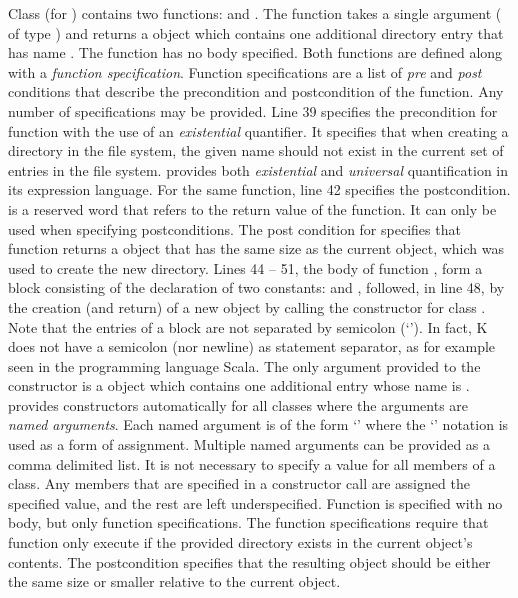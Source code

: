 Class  (for ) contains two functions:
 and . The  function takes a
single argument ( of type ) and returns a
 object which contains one additional directory entry that
has name . The  function has no body
specified. Both functions are defined along with a {\em function
  specification}. Function specifications are a list of {\em pre} and
{\em post} conditions that describe the precondition and postcondition
of the function. Any number of specifications may be provided. Line 39
specifies the precondition for function  with the use of
an {\em existential} quantifier. It specifies that when creating a
directory in the file system, the given name  should not exist
in the current set of entries in the file system. \Klang{} provides
both {\em existential} and {\em universal} quantification in its
expression language. For the same function, line 42 specifies the
postcondition.  is a reserved word that refers to the
return value of the function. It can only be used when specifying
postconditions. The post condition for  specifies that
function  returns a  object that has the same
size as the current  object, which was used to create the new
directory. Lines 44 -- 51, the body of function , 
form a block consisting of the declaration of two constants:  
and , followed, in line 48, by the creation (and return) of
a new  object by calling the constructor for class
. 
Note that the entries of a block are not separated by 
semicolon (`\code{;}'). In fact, K does not have a semicolon (nor newline) 
as statement separator, as for example seen in the programming language
Scala. The only argument provided to the  constructor is a
 object which contains one additional  entry whose
name is . \Klang{} provides constructors automatically for all
classes where the arguments are {\em named arguments}. Each named
argument is of the form `' where the `\code{::}'
notation is used as a form of assignment. Multiple named arguments can
be provided as a comma delimited list. It is not necessary to specify
a value for all members of a class. Any members that are specified in
a constructor call are assigned the specified value, and the rest are
left underspecified.  
Function  is
specified with no body, but only function specifications. The function
specifications require that function  only execute if the
provided directory  exists in the current object's
contents. The postcondition specifies that the resulting 
object should be either the same size or smaller relative to the
current object.

